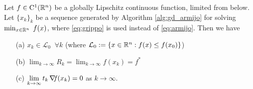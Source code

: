 \documentclass[10pt,a4paper]{article}
\begin{document}
\begin{theorem}
	Let $f\in \mathord{\mathrm{C^1}}(\mathbb{R}^n)$ be a globally Lipschitz continuous function, limited from below. Let $\{x_k\}_k$ be a sequence generated by Algorithm \ref{alg:gd_armijo} for solving $\min_{x\in\mathbb{R}^n}\;f(x)$, where \eqref{eq:grippo} is used instead of \eqref{eq:armijo}. Then we have 
	\begin{itemize}
		\item[(a)] $x_k \in \mathcal{L}_0 \;\;\forall k$ (where $\mathcal{L}_0:=\{x\in\mathbb{R}^n: f(x)\leq f(x_0)\}$)
		\item[(b)] $\displaystyle\lim_{k \to \infty} R_k = \displaystyle\lim_{k \to \infty} f(x_k) = f^*$ 
		\item[(c)] $\displaystyle\lim_{k \to \infty} t_k \operatorname*{\mathit{\nabla \!f}}(x_k) = 0$ as $k\to \infty$.
	\end{itemize}
\end{theorem}
\end{document}
